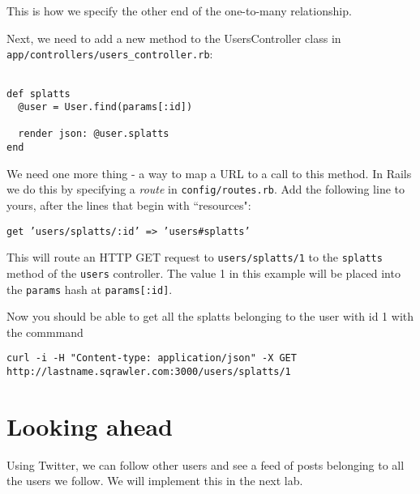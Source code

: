 \documentclass{article}
\begin{document}
This is how we specify the other end of the one-to-many relationship. 

Next, we need to add a new method to the UsersController class in \texttt{app/controllers/users\_controller.rb}:

\begin{verbatim}

def splatts
  @user = User.find(params[:id])

  render json: @user.splatts
end
\end{verbatim}

We need one more thing - a way to map a URL to a call to this method.  In Rails we do this by specifying a \emph{route} in \texttt{config/routes.rb}.  Add the following line to yours, after the lines that begin with ``resources":

\texttt{get 'users/splatts/:id' => 'users\#splatts'}

This will route an HTTP GET request to \texttt{users/splatts/1} to the \texttt{splatts} method of the \texttt{users} controller.  The value 1 in this example will be placed into the \texttt{params} hash at \texttt{params[:id]}.

Now you should be able to get all the splatts belonging to the user with id 1 with the commmand

\texttt{curl -i -H "Content-type: application/json" -X GET http://lastname.sqrawler.com:3000/users/splatts/1}

\section{Looking ahead}
Using Twitter, we can follow other users and see a feed of posts belonging to all the users we follow.  We will implement this in the next lab.
\end{document}
